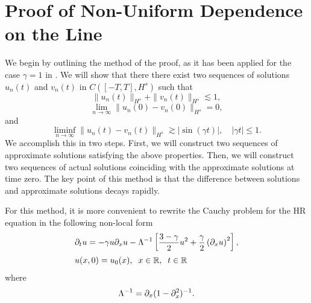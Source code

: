 \section{Proof of Non-Uniform Dependence on the Line}
\label{sec:2}
%
%
%
%
We begin by outlining the method of the proof,
as it has been applied for the case $\gamma=1$ in \cite{Himonas:2009fk}.
We will show  that there there exist two sequences of solutions 
$u_n(t)$
and $v_n(t)$ in $C([-T, T], H^s)$ such that
%
%
%
%
\begin{equation}
\label{h-s-bdd}
\| u_n(t)  \|_{H^s}
+
\| v_n(t)  \|_{H^s}
\lesssim
1,
\end{equation}
%
%
%
%
%
\begin{equation}
\label{zero-limit-at-0}
\lim_{n\to\infty}
\|
u_n(0)
-
v_n(0)
\|_{H^s}
=
0,
\end{equation}
%
%
%
%
and
%
%
%
%
\begin{equation}
\label{bdd-away-from-0}
\liminf_{n\to\infty}
\|
u_n(t)
-
v_n(t)
\|_{H^s}
\gtrsim
|\sin ( \gamma t)|,
\quad
| \gamma t|\le 1.
\end{equation}%
%
%
We accomplish this in two steps.
First, we will construct two sequences of approximate solutions
satisfying the above properties.
Then, we will construct two sequences of actual solutions 
coinciding with the approximate solutions at time zero.
The key point of this method is that 
the difference between solutions and approximate solutions
decays rapidly.

%
%
For this method, it is more convenient 
to rewrite the Cauchy problem for the HR equation 
in the following non-local form
%
%
\begin{align}
& \partial_t u =  -\gamma u \partial_x u -
\Lambda^{-1} \left[ \frac{3-\gamma}{2}u^2 +
\frac{\gamma}{2} \left( \partial_x u \right)^2
\right],
\label{apple1'}
\\
&  u(x,0) = u_0(x), \; \; x \in \mathbb{R}, \; \; t \in \mathbb{R}
\label{apple2'}
\end{align}
%
%
where 
\begin{equation*}
\Lambda^{-1} = \partial_x (1 - \partial_x^2)^{-1}.
\end{equation*}
%
%
%
%
%
%

